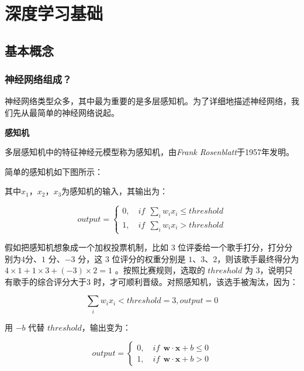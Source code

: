 \chapter{深度学习基础}\label{ux7b2cux4e09ux7ae0-ux6df1ux5ea6ux5b66ux4e60ux57faux7840}

\section{基本概念}\label{ux57faux672cux6982ux5ff5}

\subsection{神经网络组成？}\label{ux795eux7ecfux7f51ux7edcux7ec4ux6210}

神经网络类型众多，其中最为重要的是多层感知机。为了详细地描述神经网络，我们先从最简单的神经网络说起。

\textbf{感知机}

多层感知机中的特征神经元模型称为感知机，由\emph{Frank
Rosenblatt}于1957年发明。

简单的感知机如下图所示：

%  

其中\(x_1\)，\(x_2\)，\(x_3\)为感知机的输入，其输出为：

\[
output = \left\{
\begin{aligned}
0, \quad if \ \ \sum_i w_i x_i \leqslant threshold \\
1, \quad if \ \ \sum_i w_i x_i > threshold
\end{aligned}
\right.
\]

假如把感知机想象成一个加权投票机制，比如 3
位评委给一个歌手打分，打分分别为$ 4 $分、\(1\) 分、$-3$ 分，这 $3$
位评分的权重分别是 \(1、3、2\)，则该歌手最终得分为
\(4 \times 1 + 1 \times 3 + (-3) \times 2 = 1\) 。按照比赛规则，选取的
\(threshold\) 为 \(3\)，说明只有歌手的综合评分大于$ 3$
时，才可顺利晋级。对照感知机，该选手被淘汰，因为：

\[
\sum_i w_i x_i < threshold=3, output = 0
\]

用 \(-b\) 代替 \(threshold\)，输出变为：

\[
output = \left\{
\begin{aligned}
0, \quad if \ \ \boldsymbol{w} \cdot \boldsymbol{x} + b \leqslant 0 \\
1, \quad if \ \ \boldsymbol{w} \cdot \boldsymbol{x} + b > 0
\end{aligned}
\right.
\]

